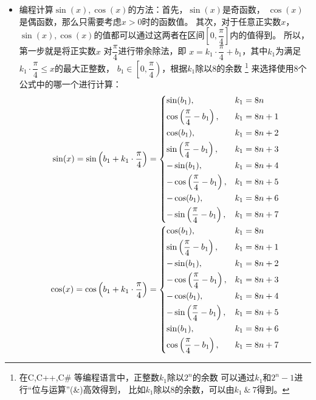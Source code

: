 \begin{itemize}[leftmargin=\inteval{\myitemleftmargin}pt,itemsep=
   \inteval{\myitemitempsep}pt,topsep=\inteval{\myitemtopsep}pt]
\item 编程计算$\sin(x),\cos(x)$的方法：首先，$\sin(x)$是奇函数，
$\cos(x)$是偶函数，那么只需要考虑$x>0$时的函数值。
其次，对于任意正实数$x$，
$\sin(x),\cos(x)$的值都可以通过这两者在区间$\left[0,
\dfrac{\pi}{4}\right]$内的值得到。
所以，第一步就是将正实数$x$
对$ \dfrac{\pi}{4} $进行带余除法，即
$ x=k_1\cdot\dfrac{\pi}{4}+b_1 $，其中$ k_1 $为满足
$ k_1\cdot\dfrac{\pi}{4}\leq x $的最大正整数，
$ b_1\in\left[0,\dfrac{\pi}{4}\right) $，根据$k_1$除以8的余数
\footnote{在C,C++,C\# 等编程语言中，正整数$k_1$除以$2^n$的余数
    可以通过$k_1$和$2^n-1$进行“位与运算”(\&)高效得到，
    比如$k_1$除以8的余数，可以由$ k_1\ \& \ 7 $得到。}
来选择使用8个公式中的哪一个进行计算：
\begin{align*}
    \sin(x)=\sin\left(b_1+k_1\cdot \dfrac{\pi}{4}\right) & =
    \begin{dcases}
        \sin(b_1),  &  k_1=8n \\
        \cos\left(\dfrac{\pi}{4}-b_1\right), & k_1=8n+1 \\
        \cos(b_1),  & k_1=8n+2 \\
        \sin\left(\dfrac{\pi}{4}-b_1\right), & k_1=8n+3 \\
        -\sin(b_1),  & k_1=8n+4 \\
        -\cos\left(\dfrac{\pi}{4}-b_1\right), & k_1=8n+5 \\
        -\cos(b_1),  & k_1=8n+6 \\
        -\sin\left(\dfrac{\pi}{4}-b_1\right), & k_1=8n+7 \\
    \end{dcases} \\
    \cos(x)=\cos\left(b_1+k_1\cdot \dfrac{\pi}{4}\right) & =
    \begin{dcases}
        \cos(b_1),  &  k_1=8n \\
        \sin\left(\dfrac{\pi}{4}-b_1\right), & k_1=8n+1 \\
        -\sin(b_1),  & k_1=8n+2 \\
        -\cos\left(\dfrac{\pi}{4}-b_1\right), & k_1=8n+3 \\
        -\cos(b_1),  & k_1=8n+4 \\
        -\sin\left(\dfrac{\pi}{4}-b_1\right), & k_1=8n+5 \\
        \sin(b_1),  & k_1=8n+6 \\
        \cos\left(\dfrac{\pi}{4}-b_1\right), & k_1=8n+7 \\
    \end{dcases}
\end{align*}

\end{itemize}
